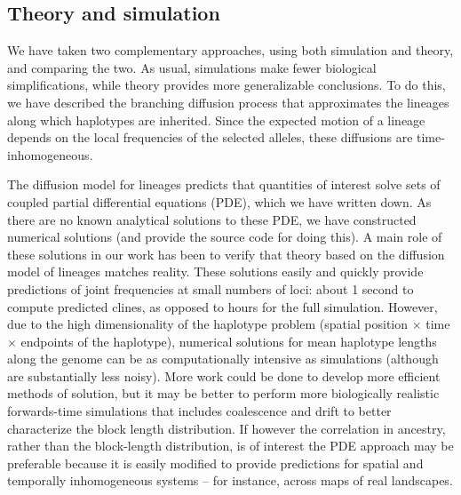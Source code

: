 \documentclass[11pt,letterpaper]{article}
\newcommand{\alisa}[1]{{\em \color{red} #1}}
\newcommand{\plr}[1]{{\em \color{blue} #1}}
\begin{document}
\subsection*{Theory and simulation}
We have taken two complementary approaches,
using both simulation and theory, and comparing the two.
As usual, simulations make fewer biological simplifications,
while theory provides more generalizable conclusions.
To do this, we have described the branching diffusion process that approximates
the lineages along which haplotypes are inherited.
Since the expected motion of a lineage depends on the local frequencies of the selected alleles,
these diffusions are time-inhomogeneous.

The diffusion model for lineages predicts that quantities of interest solve sets of coupled partial differential equations (PDE),
which we have written down.
As there are no known analytical solutions to these PDE,
we have constructed numerical solutions (and provide the source code for doing this).
A main role of these solutions in our work has been to verify that theory based on the diffusion model of lineages
matches reality.
These solutions easily and quickly provide predictions of joint frequencies at small numbers of loci:
about 1 second to compute predicted clines, as opposed to hours for the full simulation.
However, due to the high dimensionality of the haplotype problem (spatial position $\times$ time $\times$ endpoints of the haplotype),
numerical solutions for mean haplotype lengths along the genome can be as computationally intensive as simulations
(although are substantially less noisy).
More work could be done to develop more efficient methods of solution, 
but it may be better to perform more biologically realistic forwards-time simulations that includes coalescence and drift to better characterize the block length distribution.
If however the correlation in ancestry, rather than the block-length distribution, is of interest the PDE approach may be preferable because it is easily modified to provide predictions for spatial and temporally inhomogeneous systems -- for instance, across maps of real landscapes.

\end{document}

